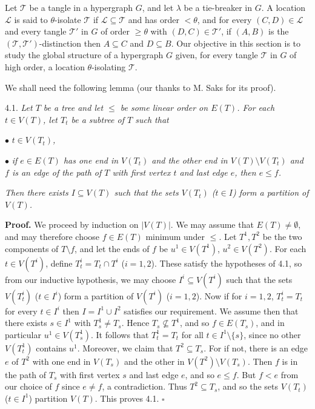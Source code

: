 
Let $\mathscr{T}$ be a tangle in a hypergraph $G$, and let $\lambda$ be a tie-breaker in $G$. A location $\mathscr{L}$ is said to $\theta$-isolate $\mathscr{T}$ if $\mathscr{L} \subseteq \mathscr{T}$ and has order $<\theta$, and for every $(C, D) \in \mathscr{L}$ and every tangle $\mathscr{T}'$ in $G$ of order $\ge \theta$ with $(D, C) \in \mathscr{T}'$, if $(A, B)$ is the $(\mathscr{T}, \mathscr{T}')$-distinction then $A \subseteq C$ and $D \subseteq B$. Our objective in this section is to study the global structure of a hypergraph $G$ given, for every tangle $\mathscr{T}$ in $G$ of high order, a location $\theta$-isolating $\mathscr{T}$.

We shall need the following lemma (our thanks to M. Saks for its proof).

4.1. \textit{Let $T$ be a tree and let $\le$ be some linear order on $E(T)$. For each $t \in V(T)$, let $T_t$ be a subtree of $T$ such that}

\hspace*{12pt}$\bullet$ \textit{$t \in V(T_t)$,}

\hspace*{12pt}$\bullet$ \textit{if $e \in E(T)$ has one end in $V(T_t)$ and the other end in $V(T) \setminus V(T_t)$ and $f$ is an edge of the path of $T$ with first vertex $t$ and last edge $e$, then $e \le f$.}

\textit{Then there exists $I \subseteq V(T)$ such that the sets $V(T_t)$ ($t \in I$) form a partition of $V(T)$.}

\textbf{Proof.} We proceed by induction on $|V(T)|$. We may assume that $E(T) \ne \emptyset$, and may therefore choose $f \in E(T)$ minimum under $\le$. Let $T^1, T^2$ be the two components of $T \setminus f$, and let the ends of $f$ be $u^1 \in V(T^1)$, $u^2 \in V(T^2)$. For each $t \in V(T^i)$, define $T_t^i = T_t \cap T^i$ ($i = 1, 2$). These satisfy the hypotheses of 4.1, so from our inductive hypothesis, we may choose $I^i \subseteq V(T^i)$ such that the sets $V(T_t^i)$ ($t \in I^i$) form a partition of $V(T^i)$ ($i = 1, 2$). Now if for $i = 1, 2$, $T_t^i = T_t$ for every $t \in I^i$ then $I = I^1 \cup I^2$ satisfies our requirement. We assume then that there exists $s \in I^1$ with $T_s^1 \ne T_s$. Hence $T_s \nsubseteq T^1$, and so $f \in E(T_s)$, and in particular $u^1 \in V(T_s^1)$. It follows that $T_t^1 = T_t$ for all $t \in I^1 \setminus \{s\}$, since no other $V(T_t^1)$ contains $u^1$. Moreover, we claim that $T^2 \subseteq T_s$. For if not, there is an edge $e$ of $T^2$ with one end in $V(T_s)$ and the other in $V(T^2) \setminus V(T_s)$. Then $f$ is in the path of $T_s$ with first vertex $s$ and last edge $e$, and so $e \le f$. But $f < e$ from our choice of $f$ since $e \ne f$, a contradiction. Thus $T^2 \subseteq T_s$, and so the sets $V(T_t)$ ($t \in I^1$) partition $V(T)$. This proves 4.1. $\square$

